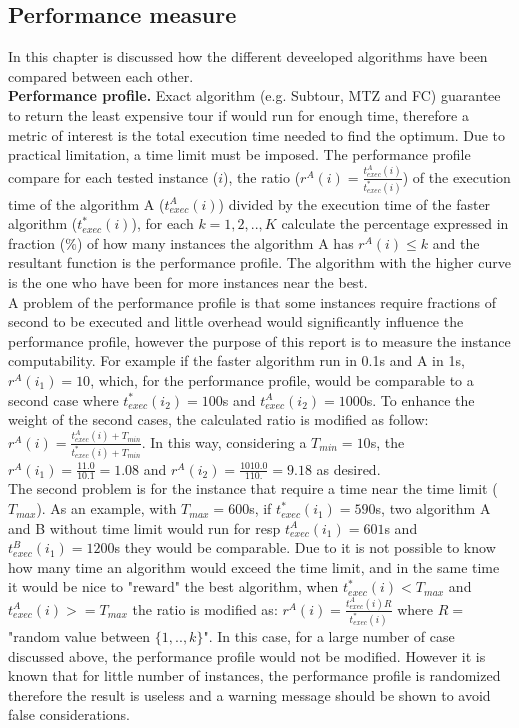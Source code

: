 \documentclass[11pt, english, openany]{report}
\begin{document}
\begin{appendices}
		\chapter{Performance measure} \label{sec:performance_meausure}
			In this chapter is discussed how the different deveeloped algorithms have been compared between each other.\\
			\textbf{Performance profile.} Exact algorithm (e.g. Subtour, MTZ and FC) guarantee to return the least expensive tour if would run for enough time, therefore a metric of interest is the total execution time needed to find the optimum. 
			Due to practical limitation, a time limit must be imposed. The performance profile compare for each tested instance ($ i $), the ratio ($ r^A(i) = \frac{t_{exec}^A(i)}{t_{exec}^*(i)} $) of the execution time of the algorithm A ($ t_{exec}^A(i) $) divided by the execution time of the faster algorithm ($ t_{exec}^*(i) $), for each $ k = 1, 2, .., K $ calculate the percentage expressed in fraction ($ \% $) of how many instances the algorithm A has $ r^A(i) \le k $ and the resultant function is the performance profile.
			The algorithm with the higher curve is the one who have been for more instances near the best.\\
			A problem of the performance profile is that some instances require fractions of second to be executed and little overhead would significantly influence the performance profile, however the purpose of this report is to measure the instance computability. For example if the faster algorithm run in 0.1s and A in 1s, $ r^A(i_1) = 10 $, which, for the performance profile, would be comparable to a second case where $ t_{exec}^*(i_2) = 100 $s and $ t_{exec}^A(i_2) = 1000 $s. To enhance the weight of the second cases, the calculated ratio is modified as follow: $ r^A(i) = \frac{t_{exec}^A(i)+T_{min}}{t_{exec}^*(i)+T_{min}} $. In this way, considering a $ T_{min} = 10$s, the $ r^A(i_1) = \frac{11.0}{10.1} = 1.08 $ and $ r^A(i_2) = \frac{1010.0}{110.} = 9.18 $ as desired.\\
			The second problem is for the instance that require a time near the time limit ($ T_{max} $). As an example, with $ T_{max} = 600 $s, if $ t_{exec}^*(i_1) = 590$s, two algorithm A and B without time limit would run for resp $ t_{exec}^A(i_1) = 601$s and $ t_{exec}^B(i_1) = 1200$s they would be comparable. Due to it is not possible to know how many time an algorithm would exceed the time limit, and in the same time it would be nice to "reward" the best algorithm, when $ t_{exec}^*(i) < T_{max} $ and $ t_{exec}^A(i) >= T_{max} $ the ratio is modified as:  $ r^A(i) = \frac{t_{exec}^A(i)R}{t_{exec}^*(i)} $ where $ R = $ "random value between $ \{1,..,k\} $". In this case, for a large number of case discussed above, the performance profile would not be modified. However it is known that for little number of instances, the performance profile is randomized therefore the result is useless and a warning message should be shown to avoid false considerations.
			

\end{appendices}
\end{document}

